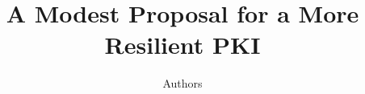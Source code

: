 \documentclass[conference]{IEEEtran}
\begin{document}
\title{
  A Modest Proposal for a More Resilient PKI
}
\author{
  Authors
}


\maketitle


\begin{abstract}
  
\end{abstract}











%









\end{document}
